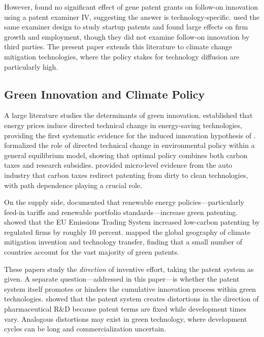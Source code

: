 \documentclass[12pt]{article}
\begin{document}
However, \citet{sampat2019} found no significant effect of gene patent grants on follow-on innovation using a patent examiner IV, suggesting the answer is technology-specific. \citet{farremensa2020} used the same examiner design to study startup patents and found large effects on firm growth and employment, though they did not examine follow-on innovation by third parties. The present paper extends this literature to climate change mitigation technologies, where the policy stakes for technology diffusion are particularly high.

\subsection{Green Innovation and Climate Policy}

A large literature studies the determinants of green innovation. \citet{popp2002} established that energy prices induce directed technical change in energy-saving technologies, providing the first systematic evidence for the induced innovation hypothesis of \citet{nordhaus1969}. \citet{acemoglu2012} formalized the role of directed technical change in environmental policy within a general equilibrium model, showing that optimal policy combines both carbon taxes and research subsidies. \citet{aghion2016} provided micro-level evidence from the auto industry that carbon taxes redirect patenting from dirty to clean technologies, with path dependence playing a crucial role.

On the supply side, \citet{johnstone2010} documented that renewable energy policies---particularly feed-in tariffs and renewable portfolio standards---increase green patenting. \citet{calel2020} showed that the EU Emissions Trading System increased low-carbon patenting by regulated firms by roughly 10 percent. \citet{dechezlepretre2011} mapped the global geography of climate mitigation invention and technology transfer, finding that a small number of countries account for the vast majority of green patents.

These papers study the \emph{direction} of inventive effort, taking the patent system as given. A separate question---addressed in this paper---is whether the patent system itself promotes or hinders the cumulative innovation process within green technologies. \citet{budish2015} showed that the patent system creates distortions in the direction of pharmaceutical R\&D because patent terms are fixed while development times vary. Analogous distortions may exist in green technology, where development cycles can be long and commercialization uncertain.
\end{document}
